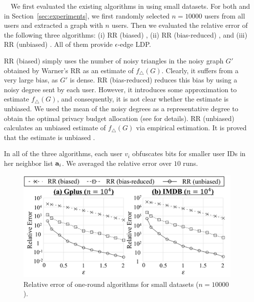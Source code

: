 \smallskip
{}~~We first evaluated the existing algorithms in \cite{Imola_USENIX21,Ye_ICDE20,Ye_TKDE21} using small datasets.
For both \GPlus{} and \IMDB{} in Section~\ref{sec:experiments}, we first randomly selected $n=10000$ users from all users and extracted a graph with $n$ users.
Then we evaluated the relative error of the following three algorithms:
(i) \textsf{RR (biased)} \cite{Imola_USENIX21,Ye_ICDE20},
(ii) \textsf{RR (bias-reduced)} \cite{Ye_TKDE21}, and
(iii) \textsf{RR (unbiased)} \cite{Imola_USENIX21}.
All of them provide $\epsilon$-edge LDP.

\textsf{RR (biased)} simply uses the number of noisy triangles in the noisy graph $G'$ obtained by Warner's RR
as an estimate of $f_\triangle(G)$.
Clearly, it suffers from a very large bias, as $G'$ is dense.
\textsf{RR (bias-reduced)} reduces
this bias
by using a noisy degree sent by each user.
However, it introduces some approximation to estimate $f_\triangle(G)$, and consequently, it is not clear whether the estimate is unbiased.
We used the mean of the noisy degrees as a representative degree to obtain the optimal privacy budget allocation (see \cite{Ye_TKDE21} for details).
\textsf{RR (unbiased)} calculates an unbiased estimate of $f_\triangle(G)$ via empirical estimation. It is proved that the estimate is unbiased \cite{Imola_USENIX21}.

In all of the three algorithms, each user $v_i$ obfuscates bits for smaller user IDs in her neighbor list $\mathbf{a}_i$. 
We averaged the relative error over $10$ runs.

\begin{figure}[t]
  \centering
  \includegraphics[width=0.99\linewidth]{fig/resB_one_round_small.pdf}
  \vspace{-4mm}
  \caption{Relative error of one-round algorithms for small datasets ($n=10000$).}
  \label{fig:resB_small}
\end{figure}

